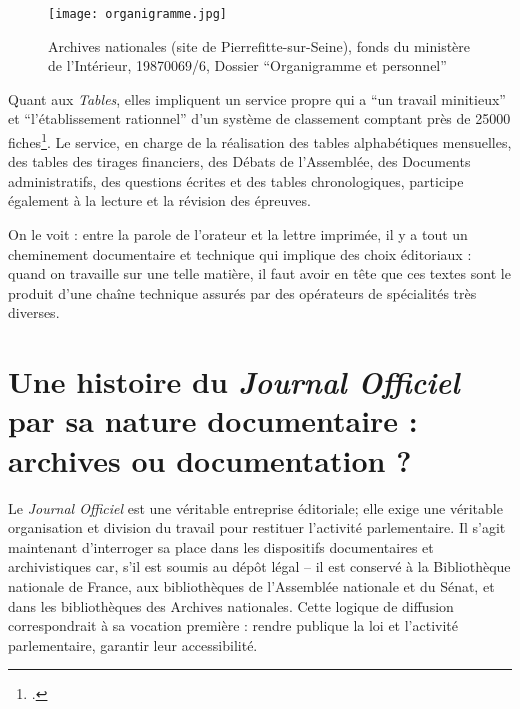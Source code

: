 \begin{figure}[htbp]
\centering
\texttt{[image: organigramme.jpg]}
\caption{Archives nationales (site de Pierrefitte-sur-Seine), fonds du ministère de l'Intérieur, 19870069/6, Dossier \enquote{Organigramme et personnel} }
\label{fig:organigramme}
\end{figure}

Quant aux \emph{Tables}, elles impliquent un service propre qui a \enquote{un travail minitieux} et \enquote{l'établissement rationnel} d'un système de classement comptant près de 25000 fiches\footcite[][]{cote6}. Le service, en charge de la réalisation des tables alphabétiques mensuelles, des tables des tirages financiers, des Débats de l'Assemblée, des Documents administratifs, des questions écrites et des tables chronologiques, participe également à la lecture et la révision des épreuves. 

On le voit : entre la parole de l'orateur et la lettre imprimée, il y a tout un cheminement documentaire et technique qui implique des choix éditoriaux : quand on travaille sur une telle matière, il faut avoir en tête que ces textes sont le produit d'une chaîne technique assurés par des opérateurs de spécialités très diverses.

\section{Une histoire du \emph{Journal Officiel} par sa nature documentaire : archives ou documentation ?}

Le \emph{Journal Officiel} est une véritable entreprise éditoriale; elle exige une véritable organisation et division du travail pour restituer l'activité parlementaire. Il s’agit maintenant d’interroger sa place dans les dispositifs documentaires et archivistiques car, s'il est soumis au dépôt légal -- il est conservé à la Bibliothèque nationale de France, aux bibliothèques de l’Assemblée nationale et du Sénat, et dans les bibliothèques des Archives nationales. Cette logique de diffusion correspondrait à sa vocation première : rendre publique la loi et l’activité parlementaire, garantir leur accessibilité.

